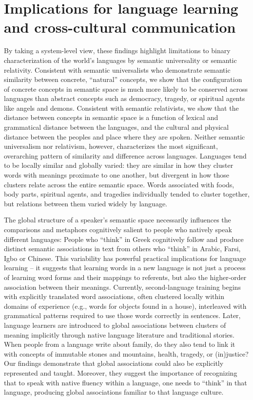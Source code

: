 \documentclass[9pt,twocolumn,twoside,lineno]{pnas-new}
\begin{document}
\section*{Implications for language learning and cross-cultural communication}
By taking a system-level view, these findings highlight limitations to binary characterization of the world's languages by semantic universality or semantic relativity. Consistent with semantic universalists who demonstrate semantic similarity between concrete, ``natural'' concepts, we show that the configuration of concrete concepts in semantic space is much more likely to be conserved across languages than abstract concepts such as democracy, tragedy, or spiritual agents like angels and demons. Consistent with semantic relativists, we show that the distance between concepts in semantic space is a function of lexical and grammatical distance between the languages, and the cultural and physical distance between the peoples and place where they are spoken. Neither semantic universalism nor relativism, however, characterizes the most significant, overarching pattern of similarity and difference across languages. Languages tend to be locally similar and globally varied: they are similar in how they cluster words with meanings proximate to one another, but divergent in how those clusters relate across the entire semantic space. Words associated with foods, body parts, spiritual agents, and tragedies individually tended to cluster together, but relations between them varied widely by language. 

The global structure of a speaker's semantic space necessarily influences the comparisons and metaphors cognitively salient to people who natively speak different languages: People who ``think'' in Greek cognitively follow and produce distinct semantic associations in text from others who ``think'' in Arabic, Farsi, Igbo or Chinese. This variability has powerful practical implications for language learning -- it suggests that learning words in a new language is not just a process of learning word forms and their mappings to referents, but also the higher-order association between their meanings. Currently, second-language training begins with explicitly translated word associations, often clustered locally within domains of experience (e.g., words for objects found in a house), interleaved with grammatical patterns required to use those words correctly in sentences. Later, language learners are introduced to global associations between clusters of meaning implicitly through native language literature and traditional stories. When people from a language write about family, do they also tend to link it with concepts of immutable stones and mountains, health, tragedy, or (in)justice? Our findings demonstrate that global associations could also be explicitly represented and taught. Moreover, they suggest the importance of recognizing that to speak with native fluency within a language, one needs to ``think'' in that language, producing global associations familiar to that language culture.
\end{document}
